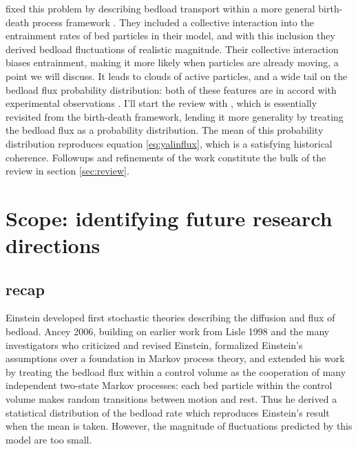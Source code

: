 \citet{Ancey2008} fixed this problem by describing bedload transport within a more general birth-death process framework \citep{Cox1965}. 
They included a collective interaction into the entrainment rates of bed particles in their model, and with this inclusion they derived bedload fluctuations of realistic magnitude. 
Their collective interaction biases entrainment, making it more likely when particles are already moving, a point we will discuss.  
It leads to clouds of active particles, and a wide tail on the bedload flux probability distribution: both of these features are in accord with experimental observations \citep{Drake1988, Ancey2006, Ancey2008}. 
I'll start the review with \citet{Ancey2006}, which is essentially \citet{Einstein1950} revisited from the birth-death framework, lending it more generality by treating the bedload flux as a probability distribution.   
The mean of this probability distribution reproduces equation \ref{eq:yalinflux}, which is a satisfying historical coherence. 
Followups and refinements of the \citet{Ancey2006} work constitute the bulk of the review in section \ref{sec:review}. 

\section{Scope: identifying future research directions}
\label{sec:scope}







\subsection{recap} 
Einstein developed first stochastic theories describing the diffusion and flux of bedload. 
Ancey 2006, building on earlier work from Lisle 1998 and the many investigators who criticized and revised Einstein, formalized Einstein's assumptions over a foundation in Markov process theory, and extended his work by treating the bedload flux within a control volume as the cooperation of many independent two-state Markov processes: each bed particle within the control volume makes random transitions between motion and rest. 
Thus he derived a statistical distribution of the bedload rate which reproduces Einstein's result when the mean is taken. 
However, the magnitude of fluctuations predicted by this model are too small. 

